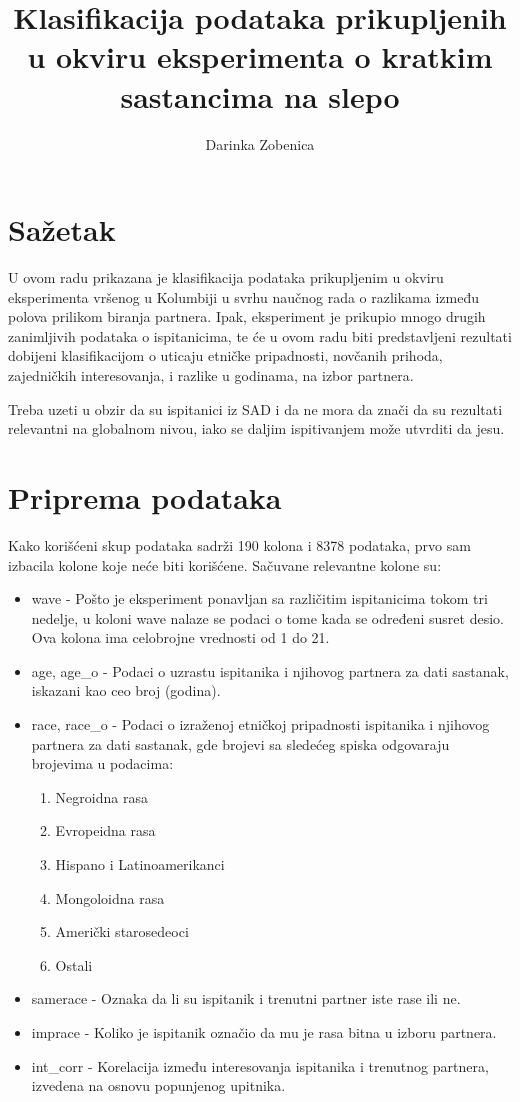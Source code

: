 \documentclass{article}
\title{Klasifikacija podataka prikupljenih u okviru eksperimenta o kratkim sastancima na slepo}
\author{Darinka Zobenica}
\date{}
\begin{document}
\maketitle

\section*{Sažetak}
U ovom radu prikazana je klasifikacija podataka prikupljenim u okviru eksperimenta vršenog u Kolumbiji u svrhu naučnog rada o razlikama između polova prilikom biranja partnera.\cite{genderdatingpreferences} Ipak, eksperiment je prikupio mnogo drugih zanimljivih podataka o ispitanicima, te će u ovom radu biti predstavljeni rezultati dobijeni klasifikacijom o uticaju etničke pripadnosti, novčanih prihoda, zajedničkih interesovanja, i razlike u godinama, na izbor partnera.\par
Treba uzeti u obzir da su ispitanici iz SAD i da ne mora da znači da su rezultati relevantni na globalnom nivou, iako se daljim ispitivanjem može utvrditi da jesu.

\tableofcontents
\newpage
\section{Priprema podataka}
Kako korišćeni skup podataka sadrži 190 kolona i 8378 podataka, prvo sam izbacila kolone koje neće biti korišćene. Sačuvane relevantne kolone su:

\begin{itemize}
    \item wave - Pošto je eksperiment ponavljan sa različitim ispitanicima tokom tri nedelje, u koloni wave nalaze se podaci o tome kada se određeni susret desio. Ova kolona ima celobrojne vrednosti od 1 do 21.
    \item age, age\_o - Podaci o uzrastu ispitanika i njihovog partnera za dati sastanak, iskazani kao ceo broj (godina).
    \item race, race\_o - Podaci o izraženoj etničkoj pripadnosti ispitanika i njihovog partnera za dati sastanak, gde brojevi sa sledećeg spiska odgovaraju brojevima u podacima:
    \begin{enumerate}
        \item Negroidna rasa
        \item Evropeidna rasa
        \item Hispano i Latinoamerikanci
        \item Mongoloidna rasa
        \item Američki starosedeoci
        \item Ostali
    \end{enumerate}
    \item samerace - Oznaka da li su ispitanik i trenutni partner iste rase ili ne.
    \item imprace - Koliko je ispitanik označio da mu je rasa bitna u izboru partnera.
    \item int\_corr - Korelacija između interesovanja ispitanika i trenutnog partnera, izvedena na osnovu popunjenog upitnika.
\end{itemize}
\end{document}
